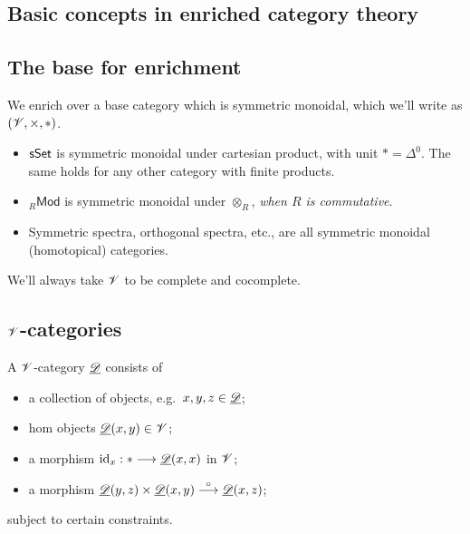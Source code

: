 \documentclass[11pt]{article}
\begin{document}
\begin{4. Basic concepts in enriched category theory}
\section*{Basic concepts in enriched category theory}
\subsection*{The base for enrichment}
\begin{itemise}
\setlength{\parindent}{.25in}
\item We enrich over a base category which is symmetric monoidal, which we'll write as $(\mathscr{V},\times ,*)$.
\begin{itemize}\squishlist
\setlength{\parindent}{.25in}
\item $\operatorname{{\mathsf{sSet}}}$ is symmetric monoidal under cartesian product, with unit $*=\Delta^0$. The same holds for any other category with finite products.
\item ${{_R}\mathsf{Mod}}$ is symmetric monoidal under $\otimes_R$, \emph{when $R$ is commutative}.
\item Symmetric spectra, orthogonal spectra, etc., are all symmetric monoidal (homotopical) categories.
\end{itemize}
\item We'll always take $\mathscr{V}$ to be complete and cocomplete.
\end{itemise}

\subsection*{$\mathscr{V}$-categories}
\begin{itemise}
\setlength{\parindent}{.25in}
\item A $\mathscr{V}$-category $\underline{\mathscr{D}}$ consists of
\begin{itemize}\squishlist
\setlength{\parindent}{.25in}
\item a collection of objects, e.g.\ $x,y,z\in\underline{\mathscr{D}}$;
\item hom objects $\underline{\mathscr{D}}(x,y)\in\mathscr{V}$;
\item a morphism $\textup{id}_x:*\longrightarrow\underline{\mathscr{D}}(x,x)$ in $\mathscr{V}$;
\item a morphism $\underline{\mathscr{D}}(y,z)\times \underline{\mathscr{D}}(x,y)\overset{\circ}{\longrightarrow}\underline{\mathscr{D}}(x,z)$;
\end{itemize}
subject to certain constraints.


\end{itemise}
\end{4. Basic concepts in enriched category theory}
\end{document}

